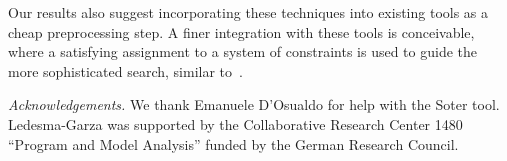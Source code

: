 Our results also suggest 
incorporating these techniques into existing tools as a cheap preprocessing step.
A finer integration with these tools is conceivable, where a
satisfying assignment to a system of constraints is used to guide the more
sophisticated search, similar to~\cite{WimmelWolf12}.


\smallskip
\noindent\textit{Acknowledgements.}
%
We thank Emanuele D'Osualdo for help with the Soter tool.
Ledesma-Garza was supported by the
Collaborative Research Center 1480 ``Program and Model Analysis'' funded by the German Research Council.







